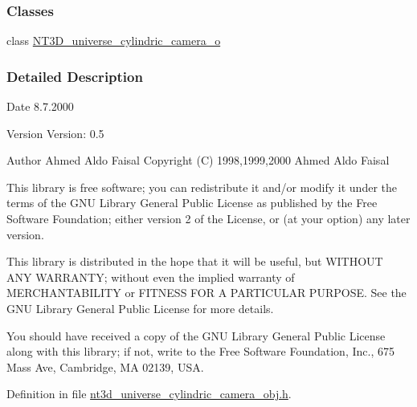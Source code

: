 \subsubsection*{Classes}
\begin{DoxyCompactItemize}
\item 
class \hyperlink{class_n_t3_d__universe__cylindric__camera__o}{NT3D\_\-universe\_\-cylindric\_\-camera\_\-o}
\end{DoxyCompactItemize}


\subsubsection{Detailed Description}
\begin{DoxyDate}{Date}
8.7.2000
\end{DoxyDate}
\begin{DoxyVersion}{Version}
Version: 0.5 
\end{DoxyVersion}
\begin{DoxyAuthor}{Author}
Ahmed Aldo Faisal Copyright (C) 1998,1999,2000 Ahmed Aldo Faisal
\end{DoxyAuthor}
This library is free software; you can redistribute it and/or modify it under the terms of the GNU Library General Public License as published by the Free Software Foundation; either version 2 of the License, or (at your option) any later version.

This library is distributed in the hope that it will be useful, but WITHOUT ANY WARRANTY; without even the implied warranty of MERCHANTABILITY or FITNESS FOR A PARTICULAR PURPOSE. See the GNU Library General Public License for more details.

You should have received a copy of the GNU Library General Public License along with this library; if not, write to the Free Software Foundation, Inc., 675 Mass Ave, Cambridge, MA 02139, USA. 

Definition in file \hyperlink{nt3d__universe__cylindric__camera__obj_8h_source}{nt3d\_\-universe\_\-cylindric\_\-camera\_\-obj.h}.

